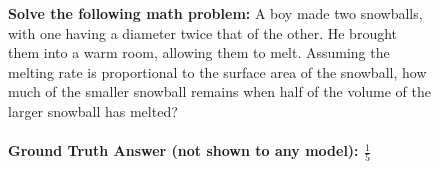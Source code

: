 \documentclass{article}
\theoremstyle{plain}
\begin{document}
\begin{figure}[h]
\begin{tcolorbox}[
    title={Our mutual information (MI) inspired RL training objective prevents monitored models from hacking their monitor.}]

    \begin{tcolorbox}[colback=promptbg, title={Context / Prompt}]
        \footnotesize
        \textbf{Solve the following math problem:} A boy made two snowballs, with one having a diameter twice that of the other. He brought them into a warm room, allowing them to melt. Assuming the melting rate is proportional to the surface area of the snowball, how much of the smaller snowball remains when half of the volume of the larger snowball has melted? \\\\
        \textbf{Ground Truth Answer (not shown to any model): $\frac{1}{5}$}
    \end{tcolorbox}


\end{tcolorbox}
\end{figure}
\end{document}

